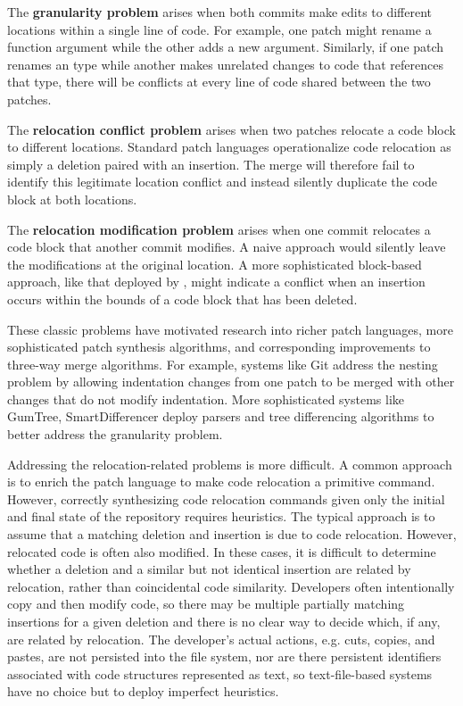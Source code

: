 The \textbf{granularity problem} 
arises when both commits make edits to different locations within a single line of code. For example, one patch might rename a function argument while the other adds a new argument. 
Similarly, if one patch renames an type while another 
makes unrelated changes to code that references that type,
there will be conflicts at every line of code shared between the two patches. 
 
The \textbf{relocation conflict problem} arises when two patches relocate a code block to different locations. 
Standard patch languages operationalize code relocation as simply a deletion paired with an insertion. The merge will therefore fail to identify this legitimate location conflict and instead silently duplicate the code block at both locations.

The \textbf{relocation modification problem} arises when one commit relocates a code block that another commit modifies. 
A naive approach would silently leave the modifications at the original location. A more sophisticated block-based approach, like that deployed by , might indicate a conflict when an insertion occurs within the bounds of a code block that has been deleted.

These classic problems have motivated research into richer patch languages, more sophisticated patch synthesis algorithms, and corresponding improvements to three-way merge algorithms. 
For example, systems like Git address the nesting problem by allowing indentation changes from one patch to be merged with other changes that do not modify indentation. 
More sophisticated systems like GumTree, SmartDifferencer deploy parsers and tree differencing algorithms to better
address the granularity problem.

Addressing the relocation-related problems is more difficult.
A common approach is to enrich the patch language to make code relocation a primitive command.
However, correctly synthesizing code relocation commands given only the initial and final state of the repository requires heuristics. 
The typical approach is to assume that a matching deletion and insertion is due to code relocation. However, relocated code is often also modified. 
In these cases, it is difficult to determine whether a deletion and a similar but not identical insertion are related by relocation, rather than coincidental code similarity. 
Developers often intentionally copy and then modify code, so there may be multiple partially matching insertions for a given deletion and there is no clear way to decide which, if any, are related by relocation. 
The developer's actual actions, e.g. cuts, copies, and pastes, are not persisted into the file system, nor are there persistent identifiers associated with code structures represented as text, so text-file-based systems have no choice but to deploy imperfect heuristics.

